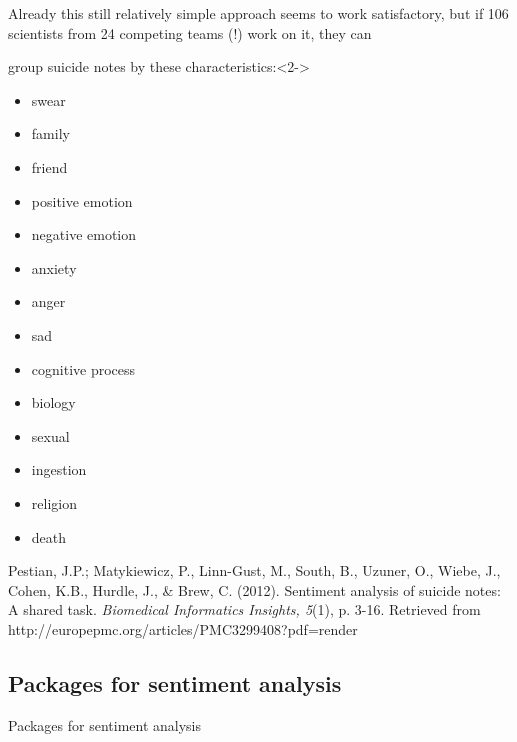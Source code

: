 \documentclass{beamer}
\begin{document}
\begin{frame}{}
Already this still relatively simple approach seems to work satisfactory, but if 106 scientists from 24 competing teams (!) work on it, they can 
\begin{block}{group suicide notes by these characteristics:}<2->
\begin{multicols}{2}
{\small {
\begin{itemize}
\item swear
\item family
\item friend
\item positive emotion
\item negative emotion
\item anxiety
\item anger
\item sad
\item cognitive process
\item biology
\item sexual
\item ingestion
\item religion
\item death
\end{itemize}
}}
\end{multicols}
\end{block}
\par
\tiny{Pestian, J.P.; Matykiewicz, P., Linn-Gust, M., South, B., Uzuner, O., Wiebe, J., Cohen, K.B., Hurdle, J., \& Brew, C. (2012). Sentiment analysis of suicide notes: A shared task. \emph{Biomedical Informatics Insights, 5}(1), p. 3-16. Retrieved from http://europepmc.org/articles/PMC3299408?pdf=render}\\
\end{frame}



\subsection{Packages for sentiment analysis}

\begin{frame}[plain]
Packages for sentiment analysis
\end{frame}
\end{document}
